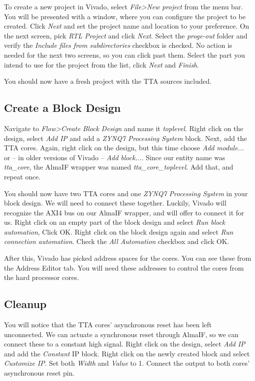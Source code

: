 \documentclass[twoside]{tceusermanual}
\begin{document}
To create a new project in Vivado, select \textit{File>New project} from the
menu bar. You will be presented with a window, where you can configure the
project to be created. Click \textit{Next} and set the project name and location
to your preference. On the next screen, pick \textit{RTL Project} and click
\textit{Next}. Select the \textit{proge-out} folder and verify the
\textit{Include files from subdirectories} checkbox is checked. No action is
needed for the next two screens, so you can click past them. Select the part
you intend to use for the project from the list, click \textit{Next} and
\textit{Finish}.

You should now have a fresh project with the TTA sources included.

\subsection{Create a Block Design}

Navigate to \textit{Flow>Create Block Design} and name it \textit{toplevel}.
Right click on the design, select \textit{Add IP} and add a \textit{ZYNQ7
Processing System} block. Next, add the TTA cores. Again, right click on the
design, but this time choose \textit{Add module...} or -- in older versions
of Vivado -- \textit{Add block...}. Since our entity name was
\textit{tta\_core}, the AlmaIF wrapper was named \textit{tta\_core\_toplevel}.
Add that, and repeat once.

You should now have two TTA cores and one \textit{ZYNQ7 Processing System} in
your block design. We will need to connect these together. Luckily, Vivado
will recognize the AXI4 bus on our AlmaIF wrapper, and will offer to connect
it for us. Right click on an empty part of the block design and select
\textit{Run block automation}, Click OK. Right click on the block design again
and select \textit{Run connection automation}. Check  the
\textit{All Automation} checkbox and click OK.

After this, Vivado has picked address spaces for the cores. You can see these
from the Address Editor tab. You will need these addresses to control the cores
from the hard processor cores.

\subsection{Cleanup}

You will notice that the TTA cores' asynchronous reset has been left
unconnected. We can actuate a synchronous reset through AlmaIF, so we can
connect these to a constant high signal. Right click on the design, select
\textit{Add IP} and add the \textit{Constant} IP block. Right click on the
newly created block and select \textit{Customize IP}. Set both \textit{Width}
and \textit{Value} to 1. Connect the output to both cores' asynchronous reset
pin.
\end{document}
